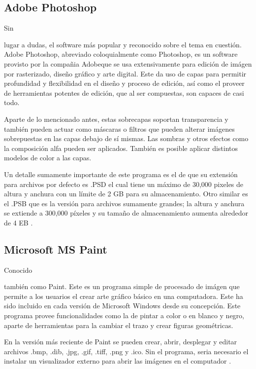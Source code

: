 \documentclass[stu, 12pt, letterpaper, donotrepeattitle, floatsintext, natbib]{apa7}
\begin{document}
    \subsection{Adobe Photoshop}
    Sin \begin{justifying}
    lugar a dudas, el software más popular y reconocido sobre el tema en cuestión. Adobe Photoshop, abreviado coloquialmente como Photoshop, es un software provisto
    por la compañia Adobeque se usa extensivamente para edición de imágen por rasterizado, diseño gráfico y arte digital. Este da uso de capas para permitir
    profundidad y flexibilidad en el diseño y proceso de edición, así como el proveer de herramientas potentes de edición, que al ser compuestas, son capaces de casi todo.\par
    Aparte de lo mencionado antes, estas sobrecapas soportan transparencia y también pueden actuar como máscaras o filtros que pueden alterar imágenes sobrepuestas en las capas debajo
    de sí mismas. Las sombras y otros efectos como la composición alfa pueden ser aplicados. También es posible aplicar distintos modelos de color a las capas.\par
    Un detalle sumamente importante de este programa es el de que su extensión para archivos por defecto es .PSD el cual tiene un máximo de 30,000 pixeles de altura y anchura con un límite
    de 2 GB para su almacenamiento. Otro similar es el .PSB que es la versión para archivos sumamente grandes; la altura y anchura se extiende a 300,000 píxeles y su 
    tamaño de almacenamiento aumenta alrededor de 4 EB \citep{techopedia-2017}. \par
    \end{justifying}    
    \subsection{Microsoft MS Paint}
    Conocido \begin{justifying}
    también como Paint. Este es un programa simple de procesado de imágen que permite a los usuarios el crear arte gráfico básico en una computadora. Este ha sido incluido en cada
    versión de Microsoft Windows desde su concepción. Este programa provee funcionalidades como la de pintar a color o en blanco y negro, aparte de herramientas para la cambiar el trazo
    y crear figuras geométricas.\par
    En la versión más reciente de Paint se pueden crear, abrir, desplegar y editar archivos .bmp, .dib, .jpg, .gif, .tiff, .png y .ico. Sin el programa, seria necesario el instalar un
    visualizador externo para abrir las imágenes en el computador \citep{computer-hope-2021}.\par     
    \end{justifying}
\end{document}
